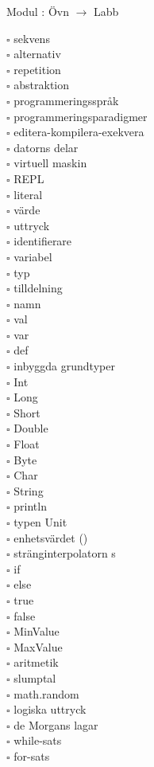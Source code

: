 
    Modul : Övn  $\rightarrow$ Labb 
    \begin{multicols}{3}\SlideFontTiny
    $\square$ sekvens \\
$\square$ alternativ \\
$\square$ repetition \\
$\square$ abstraktion \\
$\square$ programmeringsspråk \\
$\square$ programmeringsparadigmer \\
$\square$ editera-kompilera-exekvera \\
$\square$ datorns delar \\
$\square$ virtuell maskin \\
$\square$ REPL \\
$\square$ literal \\
$\square$ värde \\
$\square$ uttryck \\
$\square$ identifierare \\
$\square$ variabel \\
$\square$ typ \\
$\square$ tilldelning \\
$\square$ namn \\
$\square$ val \\
$\square$ var \\
$\square$ def \\
$\square$ inbyggda grundtyper \\
$\square$ Int \\
$\square$ Long \\
$\square$ Short \\
$\square$ Double \\
$\square$ Float \\
$\square$ Byte \\
$\square$ Char \\
$\square$ String \\
$\square$ println \\
$\square$ typen Unit \\
$\square$ enhetsvärdet () \\
$\square$ stränginterpolatorn s \\
$\square$ if \\
$\square$ else \\
$\square$ true \\
$\square$ false \\
$\square$ MinValue \\
$\square$ MaxValue \\
$\square$ aritmetik \\
$\square$ slumptal \\
$\square$ math.random \\
$\square$ logiska uttryck \\
$\square$ de Morgans lagar \\
$\square$ while-sats \\
$\square$ for-sats \\
    \end{multicols}
    